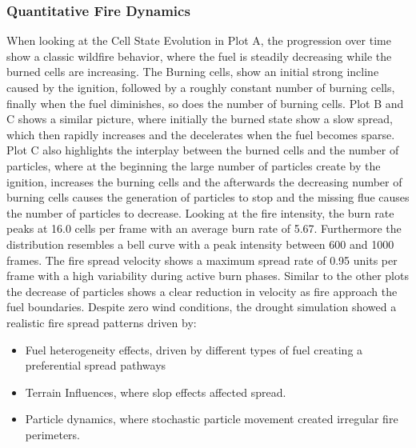 \subsubsection{Quantitative Fire Dynamics}
When looking at the Cell State Evolution in Plot A, the progression over time show a classic wildfire behavior, where the fuel is steadily decreasing while the burned cells are increasing. The Burning cells, show an initial strong incline caused by the ignition, followed by a roughly constant number of burning cells, finally when the fuel diminishes, so does the number of burning cells. Plot B and C shows a similar picture, where initially the burned state show a slow spread, which then rapidly increases and the decelerates when the fuel becomes sparse. Plot C also highlights the interplay between the burned cells and the number of particles, where at the beginning the large number of particles create by the ignition, increases the burning cells and the afterwards the decreasing number of burning cells causes the generation of particles to stop and the missing flue causes the number of particles to decrease.\newline
\newline
Looking at the fire intensity, the burn rate peaks at 16.0 cells per frame with an average burn rate of 5.67. Furthermore the distribution resembles a bell curve with a peak intensity between 600 and 1000 frames. The fire spread velocity shows a maximum spread rate of 0.95 units per frame with a high variability during active burn phases. Similar to the other plots the decrease of particles shows a clear reduction in velocity as fire approach the fuel boundaries.\newline
\newline
Despite zero wind conditions, the drought simulation showed a realistic fire spread patterns driven by:
\begin{itemize}
	\item Fuel heterogeneity effects, driven by different types of fuel creating a preferential spread pathways
	\item Terrain Influences, where slop effects affected spread.
	\item Particle dynamics, where stochastic particle movement created irregular fire perimeters.
\end{itemize}
